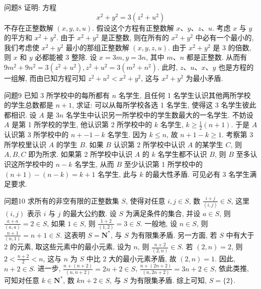 问题8 证明: 方程
$$
x^2+y^2=3\left(z^2+u^2\right)
$$
不存在正整数解 $(x, y, z, u)$.
假设这个方程有正整数解 $x 、 y 、 z 、 u$. 考虑 $x$ 与 $y$ 的平方和 $x^2+y^2$. 由于 $x^2+y^2$ 是正整数, 则在所有的 $x^2+y^2$ 中必有一个最小的, 我们考虑使 $x^2+y^2$ 最小的那组正整数解 $(x, y, z, u)$.
由于 $x^2+y^2$ 是 3 的倍数, 则 $x$ 和 $y$ 必都能被 3 整除.
设 $x=3 m, y=3 n$, 其中 $m 、 n$ 都是正整数.
从而有 $9 m^2+9 n^2=3\left(z^2+u^2\right), z^2+u^2= 3\left(m^2+n^2\right)$. 此时, $z 、 u 、 x 、 y$ 也是方程的一组解, 而由已知方程可知 $z^2+ u^2<x^2+y^2$, 这与 $x^2+y^2$ 为最小矛盾.



问题9 已知 3 所学校中的每所都有 $n$ 名学生, 且任何 1 名学生认识其他两所学校的学生总数都是 $n+1$, 求证: 可以从每所学校各选 1 名学生, 使得这 3 名学生彼此都相识.
设 $A$ 是 $3 n$ 名学生中认识另一所学校中的学生数最大的一名学生.
不妨设 $A$ 是第 1 所学校的学生, 他认识第 2 所学校中的 $k$ 名学生, $k \geqslant \frac{1}{2}(n+1)$. 于是 $A$ 认识第 3 所学校中的 $n+-1-k$ 名学生.
因为 $k \leqslant n$, 故 $n+1-k \geqslant 1$.
考察第 3 所学校里认识 $A$ 的学生 $B$. 如果 $B$ 认识第 2 所学校中认识 $A$ 的某学生 $C$, 则 $A, B, C$ 即为所求.
如果第 2 所学校中认识 $A$ 的 $k$ 名学生都不认识 $B$, 则 $B$ 至多认识这所学校中的 $n-k$ 名学生, 从而 $B$ 至少认识第 1 所学校中的 $(n+1)-(n-k)=k+1$ 名学生, 此与 $k$ 的最大性矛盾.
可见必有 3 名学生满足要求.



问题10 求所有的非空有限的正整数集 $S$, 使得对任意 $i, j \in S$, 数 $\frac{i+j}{(i, j)} \in S$, 这里 $(i, j)$ 表示 $i$ 与 $j$ 的最大公约数.
设 $S$ 为满足条件的集合, 并设 $a \in S$, 则 $\frac{a+a}{(a, a)}=2 \in S$, 如果 $1 \in S$, 则 $\frac{1+2}{(1,2)}=3 \in S$. 一般地, 设 $n \in S$, 则 $\frac{n+1}{(n, 1)}=n+1 \in S$. 这表明 $S=\mathbf{N}^*$, 与 $S$ 为有限集矛盾.
另一方面, 若 $S$ 中有大于 2 的元素, 取这些元素中的最小元素, 设为 $n$, 则 $\frac{n+2}{(2, n)} \in S$. 若 $(2, n)=2$, 则 $2<\frac{n+2}{2}<n$, 这与 $n$ 为 $S$ 中比 2 大的最小元素矛盾, 故 $(2, n)=1$. 因此, $n+2 \in S$. 进一步, $\frac{n+(n+2)}{(n, n+2)}=2 n+2 \in S$, $\frac{n+(2 n+2)}{(n, 2 n+2)}=3 n+2 \in S$, 依此类推, 可知对任意 $k \in \mathbf{N}^*$, 数 $k n+2 \in S$, 与 $S$ 为有限集矛盾.
综上可知, $S=\{2\}$.



